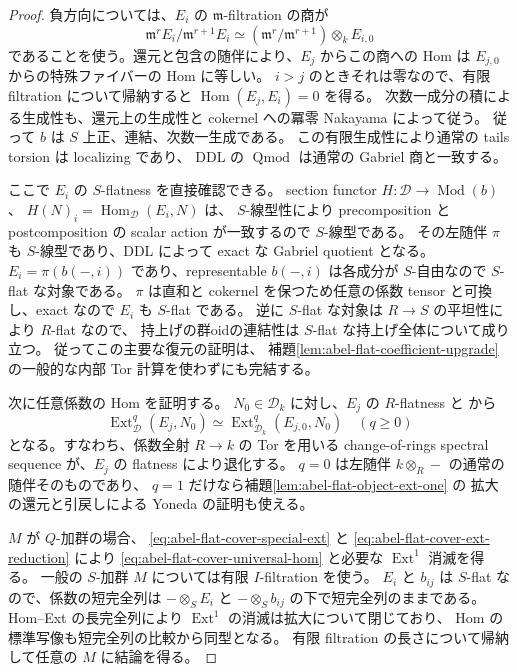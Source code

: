 \begin{proof}
負方向については、$E_i$ の $\mathfrak m$-filtration の商が
\[
 \mathfrak m^rE_i/\mathfrak m^{r+1}E_i
 \simeq(\mathfrak m^r/\mathfrak m^{r+1})\otimes_k E_{i,0}
\]
であることを使う。還元と包含の随伴により、$E_j$ からこの商への Hom は
$E_{j,0}$ からの特殊ファイバーの Hom に等しい。
$i>j$ のときそれは零なので、有限 filtration について帰納すると
$\operatorname{Hom}(E_j,E_i)=0$ を得る。
次数一成分の積による生成性も、還元上の生成性と cokernel への冪零 Nakayama によって従う。
従って $b$ は $S$ 上正、連結、次数一生成である。
この有限生成性により通常の tails torsion は localizing であり、
DDL の $\operatorname{Qmod}$ は通常の Gabriel 商と一致する。

ここで $E_i$ の $S$-flatness を直接確認できる。
section functor
$H:\mathcal D\to\operatorname{Mod}(b)$、
$H(N)_i=\operatorname{Hom}_{\mathcal D}(E_i,N)$ は、
$S$-線型性により precomposition と postcomposition の scalar action が一致するので
$S$-線型である。
その左随伴 $\pi$ も $S$-線型であり、DDL によって exact な Gabriel quotient となる。
$E_i=\pi(b(-,i))$ であり、representable $b(-,i)$ は各成分が $S$-自由なので
$S$-flat な対象である。
$\pi$ は直和と cokernel を保つため任意の係数 tensor と可換し、exact なので
$E_i$ も $S$-flat である。
逆に $S$-flat な対象は $R\to S$ の平坦性により $R$-flat なので、
持上げの群oidの連結性は $S$-flat な持上げ全体について成り立つ。
従ってこの主要な復元の証明は、
補題\ref{lem:abel-flat-coefficient-upgrade} の一般的な内部 Tor 計算を使わずにも完結する。

次に任意係数の Hom を証明する。
$N_0\in\mathcal D_k$ に対し、$E_j$ の $R$-flatness と
\cite[Proposition~4.7 の双対版]{LowenVdBDeformation} から
\begin{equation}\label{eq:abel-flat-cover-ext-reduction}
 \operatorname{Ext}^q_{\mathcal D}(E_j,N_0)
 \simeq\operatorname{Ext}^q_{\mathcal D_k}(E_{j,0},N_0)
 \quad(q\geq0)
\end{equation}
となる。すなわち、係数全射 $R\to k$ の Tor を用いる change-of-rings
spectral sequence が、$E_j$ の flatness により退化する。
$q=0$ は左随伴 $k\otimes_R-$ の通常の随伴そのものであり、
$q=1$ だけなら補題\ref{lem:abel-flat-object-ext-one} の
拡大の還元と引戻しによる Yoneda の証明も使える。

$M$ が $Q$-加群の場合、
\eqref{eq:abel-flat-cover-special-ext} と
\eqref{eq:abel-flat-cover-ext-reduction} により
\eqref{eq:abel-flat-cover-universal-hom} と必要な $\operatorname{Ext}^1$ 消滅を得る。
一般の $S$-加群 $M$ については有限 $I$-filtration を使う。
$E_i$ と $b_{ij}$ は $S$-flat なので、係数の短完全列は
$-\otimes_SE_i$ と $-\otimes_Sb_{ij}$ の下で短完全列のままである。
Hom--Ext の長完全列により $\operatorname{Ext}^1$ の消滅は拡大について閉じており、
Hom の標準写像も短完全列の比較から同型となる。
有限 filtration の長さについて帰納して任意の $M$ に結論を得る。


\end{proof}
